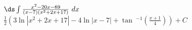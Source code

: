 {$\ds \int \frac{x^2-20x-69}{(x-7)(x^2+2x+17)}\ dx$}
{$\frac{1}{2} \left(3 \ln \left|x^2+2 x+17\right|-4 \ln |x-7|+\tan \
^{-1}\left(\frac{x+1}{4}\right)\right) +C$}
